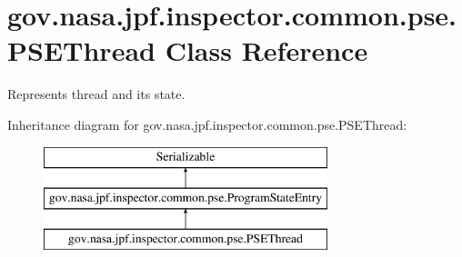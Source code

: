 \hypertarget{classgov_1_1nasa_1_1jpf_1_1inspector_1_1common_1_1pse_1_1_p_s_e_thread}{}\section{gov.\+nasa.\+jpf.\+inspector.\+common.\+pse.\+P\+S\+E\+Thread Class Reference}
\label{classgov_1_1nasa_1_1jpf_1_1inspector_1_1common_1_1pse_1_1_p_s_e_thread}


Represents thread and its state.  


Inheritance diagram for gov.\+nasa.\+jpf.\+inspector.\+common.\+pse.\+P\+S\+E\+Thread\+:\begin{figure}[H]
\begin{center}
\leavevmode
\includegraphics[height=3.000000cm]{classgov_1_1nasa_1_1jpf_1_1inspector_1_1common_1_1pse_1_1_p_s_e_thread}
\end{center}
\end{figure}
